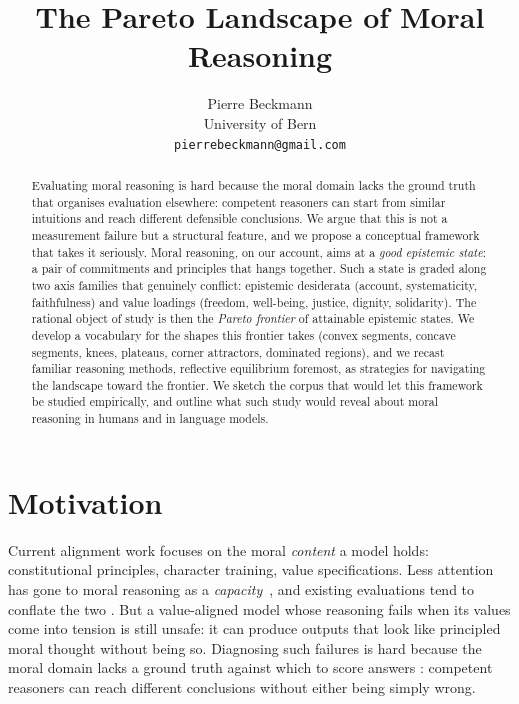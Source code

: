 \documentclass{article}
\title{The Pareto Landscape of Moral Reasoning}
\author{%
  Pierre Beckmann\\
  University of Bern\\
  \texttt{pierrebeckmann@gmail.com}
}
\begin{document}
\maketitle

\begin{abstract}
Evaluating moral reasoning is hard because the moral domain lacks the ground
truth that organises evaluation elsewhere: competent reasoners can start from
similar intuitions and reach different defensible conclusions. We argue that
this is not a measurement failure but a structural feature, and we propose a
conceptual framework that takes it seriously. Moral reasoning, on our account,
aims at a \emph{good epistemic state}: a pair of commitments and principles
that hangs together. Such a state is graded along two axis families that
genuinely conflict: epistemic desiderata (account, systematicity, faithfulness)
and value loadings (freedom, well-being, justice, dignity, solidarity). The
rational object of study is then the \emph{Pareto frontier} of attainable
epistemic states. We develop a vocabulary for the shapes this frontier takes
(convex segments, concave segments, knees, plateaus, corner attractors,
dominated regions), and we recast familiar reasoning methods, reflective
equilibrium foremost, as strategies for navigating the
landscape toward the frontier. We sketch the corpus that would let this
framework be studied empirically, and outline what such study would reveal
about moral reasoning in humans and in language models.
\end{abstract}


\section{Motivation}
\label{sec:motivation}

Current alignment work focuses on the moral \emph{content} a model holds:
constitutional principles, character training, value specifications. Less
attention has gone to moral reasoning as a \emph{capacity}~\citep{carlsmith2026},
and existing evaluations tend to conflate the two \citep{haas2026}. But a
value-aligned model whose reasoning fails when its values come into tension
is still unsafe: it can produce outputs that look like principled moral
thought without being so. Diagnosing such failures is hard because the moral
domain lacks a ground truth against which to score answers \citep{queloz2025}:
competent reasoners can reach different conclusions without either being
simply wrong.
\end{document}
